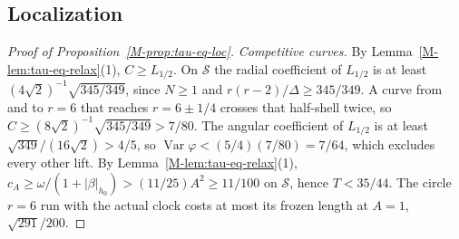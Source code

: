 \documentclass[aip,jmp,amsmath,amssymb,reprint]{revtex4-2}
\theoremstyle{plain}
\theoremstyle{definition}
\begin{document}
\subsection{Localization}
\begin{proof}[Proof of Proposition~\ref{M-prop:tau-eq-loc}]
\emph{Competitive curves.} By Lemma~\ref{M-lem:tau-eq-relax}(1), $C\ge L_{1/2}$. On $\mathcal S$ the radial
coefficient of $L_{1/2}$ is at least $(4\sqrt2)^{-1}\sqrt{345/349}$, since $N\ge1$ and $r(r-2)/\Delta\ge345/349$. A
curve from and to $r=6$ that reaches $r=6\pm1/4$ crosses that half-shell twice, so
$C\ge(8\sqrt2)^{-1}\sqrt{345/349}>7/80$. The angular coefficient of $L_{1/2}$ is at least
$\sqrt{349}/(16\sqrt2)>4/5$, so $\operatorname{Var}\varphi<(5/4)(7/80)=7/64$, which excludes every other lift. By
Lemma~\ref{M-lem:tau-eq-relax}(1), $c_A\ge\omega/(1+|\beta|_{h_0})>(11/25)A^2\ge11/100$ on $\mathcal S$, hence
$T<35/44$. The circle $r=6$ run with the actual clock costs at most its frozen length at $A=1$,
$\sqrt{291}/200$.


\end{proof}
\end{document}
